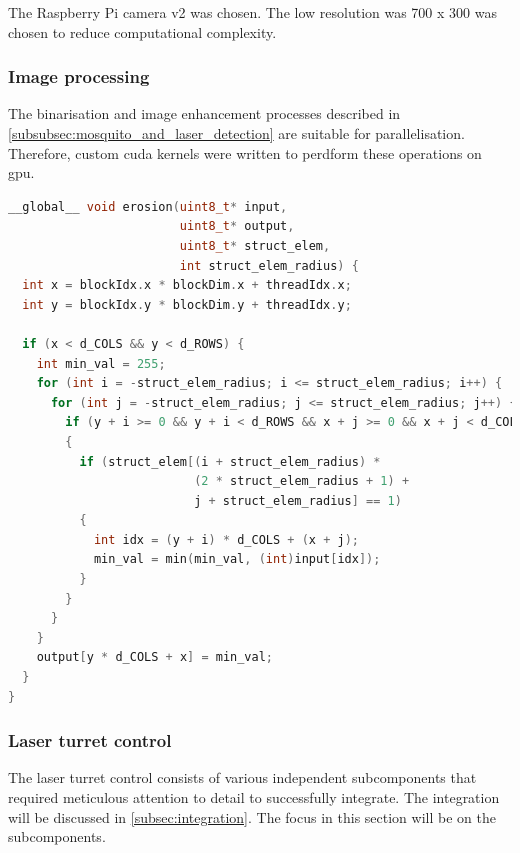 The Raspberry Pi camera v2 was chosen. The low resolution was 700 x 300 was chosen to reduce computational complexity.

\subsubsection{Image processing}
The binarisation and image enhancement processes described in \autoref{subsubsec:mosquito_and_laser_detection} are suitable for parallelisation. Therefore, custom \gls{cuda} kernels were written to perdform these operations on \gls{gpu}.

\begin{minipage}{\linewidth}
    \begin{lstlisting}[language=C++, caption={Erosion GPU kernel.}]
__global__ void erosion(uint8_t* input,
                        uint8_t* output,
                        uint8_t* struct_elem,
                        int struct_elem_radius) {
  int x = blockIdx.x * blockDim.x + threadIdx.x;
  int y = blockIdx.y * blockDim.y + threadIdx.y;
  
  if (x < d_COLS && y < d_ROWS) {
    int min_val = 255;
    for (int i = -struct_elem_radius; i <= struct_elem_radius; i++) {
      for (int j = -struct_elem_radius; j <= struct_elem_radius; j++) {
        if (y + i >= 0 && y + i < d_ROWS && x + j >= 0 && x + j < d_COLS) 
        {
          if (struct_elem[(i + struct_elem_radius) *
                          (2 * struct_elem_radius + 1) +
                          j + struct_elem_radius] == 1) 
          {
            int idx = (y + i) * d_COLS + (x + j);
            min_val = min(min_val, (int)input[idx]);
          }
        }
      }
    }
    output[y * d_COLS + x] = min_val;
  }
}
\end{lstlisting}
\end{minipage}



\subsubsection{Laser turret control}
The laser turret control consists of various independent subcomponents that required meticulous attention to detail to successfully integrate. The integration will be discussed in \autoref{subsec:integration}. The focus in this section will be on the subcomponents.



